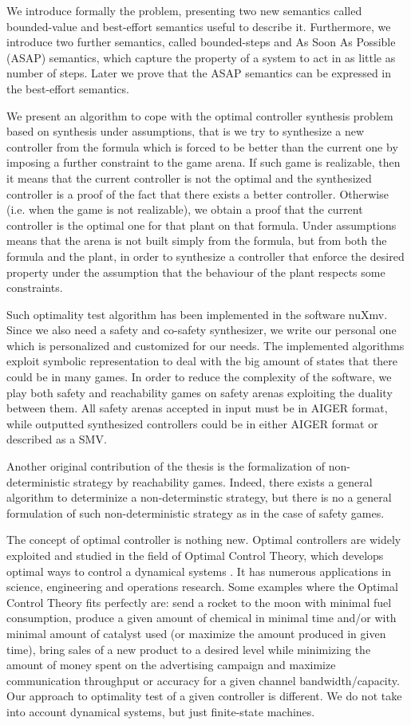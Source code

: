 We introduce formally the problem, presenting two new semantics called bounded-value and best-effort semantics useful to describe it.
Furthermore, we introduce two further semantics, called bounded-steps and As Soon As Possible (ASAP) semantics, which capture the property of a system to act in as little as number of steps.
Later we prove that the ASAP semantics can be expressed in the best-effort semantics.

We present an algorithm to cope with the optimal controller synthesis problem based on synthesis under assumptions, that is we try to synthesize a new controller from the formula which is forced to be better than the current one by imposing a further constraint to the game arena.  
If such game is realizable, then it means that the current controller is not the optimal and the synthesized controller is a proof of the fact that there exists a better controller.
Otherwise (i.e. when the game is not realizable), we obtain a proof that the current controller is the optimal one for that plant on that formula.
Under assumptions means that the arena is not built simply from the formula, but from both the formula and the plant, in order to synthesize a controller that enforce the desired property under the assumption that the behaviour of the plant respects some constraints.

Such optimality test algorithm has been implemented in the software nuXmv.
Since we also need a safety and co-safety synthesizer, we write our personal one which is personalized and customized for our needs.
The implemented algorithms exploit symbolic representation to deal with the big amount of states that there could be in many games.
In order to reduce the complexity of the software, we play both safety and reachability games on safety arenas exploiting the duality between them.
All safety arenas accepted in input must be in AIGER format, while outputted synthesized controllers could be in either AIGER format or described as a SMV.

Another original contribution of the thesis is the formalization of non-deterministic strategy by reachability games. Indeed, there exists a general algorithm to determinize a non-determinstic strategy, but there is no a general formulation of such non-deterministic strategy as in the case of safety games.

The concept of optimal controller is nothing new.
Optimal controllers are widely exploited and studied in the field of Optimal Control Theory, which develops optimal ways to control a dynamical systems \cite{BB05}. 
It has numerous applications in science, engineering and operations research.
Some examples where the Optimal Control Theory fits perfectly are: send a rocket to the moon with minimal fuel consumption,
produce a given amount of chemical in minimal time and/or with minimal amount of catalyst used (or maximize the amount produced in given time), bring sales of a new product to a desired level while minimizing the amount of money spent on the advertising campaign and maximize communication throughput or accuracy for a given channel bandwidth/capacity.
Our approach to optimality test of a given controller is different. We do not take into account dynamical systems, but just finite-state machines.

